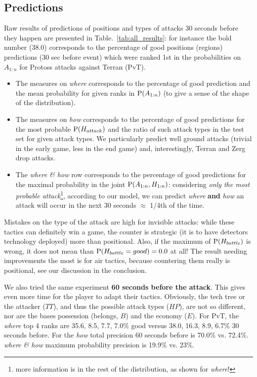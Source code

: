 \subsection{Predictions}
Raw results of predictions of positions and types of attacks 30 seconds before they happen are presented in Table.~\ref{tab:all_results}: for instance the bold number (38.0) corresponds to the percentage of good positions (regions) predictions (30 sec before event) which were ranked 1st in the probabilities on $A_{1:n}$ for Protoss attacks against Terran (PvT). 
\begin{itemize}
\item The measures on \textit{where} corresponds to the percentage of good prediction and the mean probability for given ranks in $\mathrm{P}(A_{1:n})$ (to give a sense of the shape of the distribution). 
\item The measures on \textit{how} corresponds to the percentage of good predictions for the most probable $\mathrm{P}(H_{attack})$ and the ratio of such attack types in the test set for given attack types. We particularly predict well ground attacks (trivial in the early game, less in the end game) and, interestingly, Terran and Zerg drop attacks. 
\item The \textit{where \& how} row corresponds to the percentage of good predictions for the maximal probability in the joint $\mathrm{P}(A_{1:n},H_{1:n})$: considering \textit{only the most probable attack}\footnote{more information is in the rest of the distribution, as shown for \textit{where}!}, according to our model, we can predict \textit{where} \textbf{and} \textit{how} an attack will occur in the next 30 seconds $\approx$ 1/4th of the time. 
\end{itemize}

Mistakes on the type of the attack are high for invisible attacks: while these tactics can definitely win a game, the counter is strategic (it is to have detectors technology deployed) more than positional. Also, if the maximum of $\mathrm{P}(H_{battle})$ is wrong, it does not mean than $\mathrm{P}(H_{battle}=good)=0.0$ at all! The result needing improvements the most is for air tactics, because countering them really is positional, see our discussion in the conclusion.

We also tried the same experiment \textbf{60 seconds before the attack}. This gives even more time for the player to adapt their tactics. Obviously, the tech tree or the attacker ($TT$), and thus the possible attack types ($HP$), are not so different, nor are the bases possession (belongs, $B$) and the economy ($E$). For PvT, the \textit{where} top 4 ranks are 35.6, 8.5, 7.7, 7.0\% good versus 38.0, 16.3, 8.9, 6.7\% 30 seconds before. For the \textit{how} total precision 60 seconds before is 70.0\% vs. 72.4\%. \textit{where \& how} maximum probability precision is 19.9\% vs. 23\%. 


